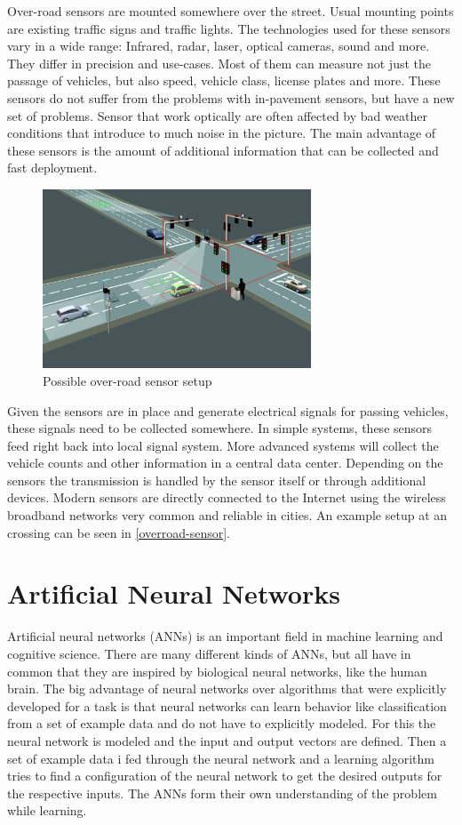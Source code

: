 Over-road sensors are mounted somewhere over the street. Usual mounting points are existing traffic signs and traffic lights. The technologies used for these sensors vary in a wide range: Infrared, radar, laser, optical cameras, sound and more. They differ in precision and use-cases. Most of them can measure not just the passage of vehicles, but also speed, vehicle class, license plates and more. These sensors do not suffer from the problems with in-pavement sensors, but have a new set of problems. Sensor that work optically are often affected by bad weather conditions that introduce to much noise in the picture. The main advantage of these sensors is the amount of additional information that can be collected and fast deployment.

\begin{figure}[ht]
	\centering
	\includegraphics[width=8cm]{figures/overroad-sensor}
	\caption{Possible over-road sensor setup}
	\label{overroad-sensor}
\end{figure}

Given the sensors are in place and generate electrical signals for passing vehicles, these signals need to be collected somewhere. In simple systems, these sensors feed right back into local signal system. More advanced systems will collect the vehicle counts and other information in a central data center. Depending on the sensors the transmission is handled by the sensor itself or through additional devices. Modern sensors are directly connected to the Internet using the wireless broadband networks very common and reliable in cities. An example setup at an crossing can be seen in \autoref{overroad-sensor}.

\section{Artificial Neural Networks}

Artificial neural networks (ANNs) is an important field in machine learning and cognitive science. There are many different kinds of ANNs, but all have in common that they are inspired by biological neural networks, like the human brain. The big advantage of neural networks over algorithms that were explicitly developed for a task is that neural networks can learn behavior like classification from a set of example data and do not have to explicitly modeled. For this the neural network is modeled and the input and output vectors are defined. Then a set of example data i fed through the neural network and a learning algorithm tries to find a configuration of the neural network to get the desired outputs for the respective inputs. The ANNs form their own understanding of the problem while learning.

